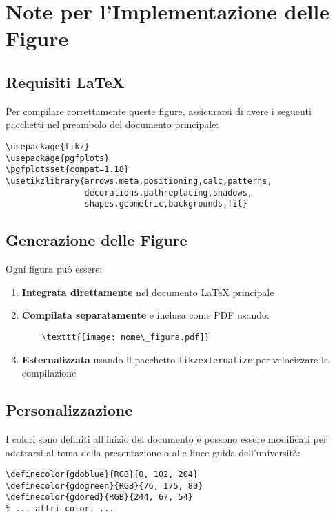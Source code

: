 \documentclass[11pt,a4paper]{article}
\begin{document}
\clearpage
\section*{Note per l'Implementazione delle Figure}

\subsection*{Requisiti LaTeX}
Per compilare correttamente queste figure, assicurarsi di avere i seguenti pacchetti nel preambolo del documento principale:

\begin{verbatim}
\usepackage{tikz}
\usepackage{pgfplots}
\pgfplotsset{compat=1.18}
\usetikzlibrary{arrows.meta,positioning,calc,patterns,
                decorations.pathreplacing,shadows,
                shapes.geometric,backgrounds,fit}
\end{verbatim}

\subsection*{Generazione delle Figure}
Ogni figura può essere:
\begin{enumerate}
    \item \textbf{Integrata direttamente} nel documento LaTeX principale
    \item \textbf{Compilata separatamente} e inclusa come PDF usando:
    \begin{verbatim}
    \texttt{[image: nome\_figura.pdf]}
    \end{verbatim}
    \item \textbf{Esternalizzata} usando il pacchetto \texttt{tikzexternalize} per velocizzare la compilazione
\end{enumerate}

\subsection*{Personalizzazione}
I colori sono definiti all'inizio del documento e possono essere modificati per adattarsi al tema della presentazione o alle linee guida dell'università:

\begin{verbatim}
\definecolor{gdoblue}{RGB}{0, 102, 204}
\definecolor{gdogreen}{RGB}{76, 175, 80}
\definecolor{gdored}{RGB}{244, 67, 54}
% ... altri colori ...
\end{verbatim}
\end{document}
